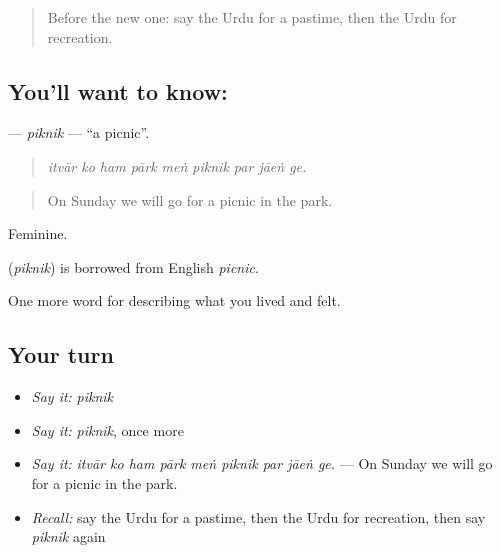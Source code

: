 \label{lesson:UR-C513-piknik}



\begin{quote}
Before the new one: say the Urdu for a pastime, then the Urdu for recreation.
\end{quote}

\subsection*{You'll want to know: }
\textbf{} — \emph{piknik} — \textquotedblleft{}a picnic\textquotedblright{}.

\begin{quote}
        
\end{quote}

\begin{quote}
\emph{itvār ko ham pārk meṅ piknik par jāeṅ ge.}
\end{quote}

\begin{quote}
On Sunday we will go for a picnic in the park.
\end{quote}

Feminine.

\begin{cousinweb}
\textbf{} (\emph{piknik}) is borrowed from English \emph{picnic}.
\end{cousinweb}

\begin{grammarlens}[title={What you've built}]
One more word for describing what you lived and felt.
\end{grammarlens}

\subsection*{Your turn}
\begin{itemize}
\raggedright
  \item \emph{Say it:} \emph{piknik}
  \item \emph{Say it:} \emph{piknik}, once more
  \item \emph{Say it:} \emph{itvār ko ham pārk meṅ piknik par jāeṅ ge.} — On Sunday we will go for a picnic in the park.
  \item \emph{Recall:} say the Urdu for a pastime, then the Urdu for recreation, then say \emph{piknik} again
\end{itemize}


